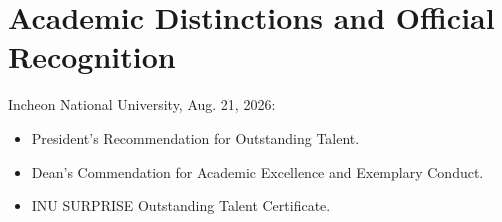 \documentclass[a4paper,11pt]{article}
\begin{document}
\section{\textbf{Academic Distinctions and Official Recognition}}
\small{
Incheon National University, Aug. 21, 2026:
\begin{itemize}
  \item President's Recommendation for Outstanding Talent.
  \item Dean's Commendation for Academic Excellence and Exemplary Conduct.
  \item INU SURPRISE Outstanding Talent Certificate.
\end{itemize}
}
\end{document}
